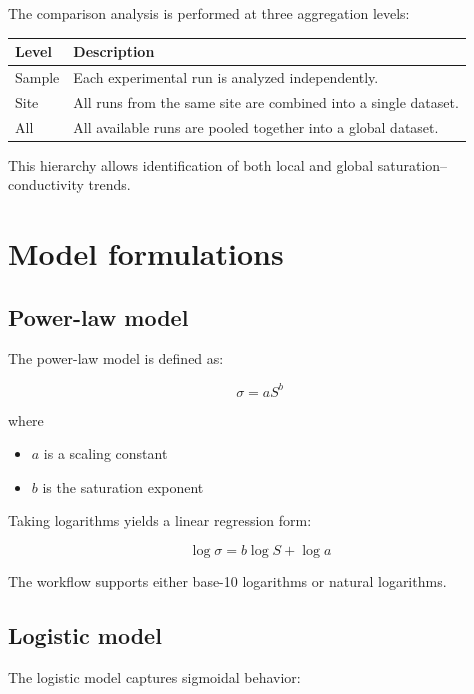\documentclass[11pt]{article}
\begin{document}
The comparison analysis is performed at three aggregation levels:

\begin{longtable}{p{} p{}}
\toprule
\textbf{Level} & \textbf{Description}\\
\midrule
\endhead

Sample & Each experimental run is analyzed independently.\\

Site & All runs from the same site are combined into a single dataset.\\

All & All available runs are pooled together into a global dataset.\\

\bottomrule
\end{longtable}

This hierarchy allows identification of both local and global saturation–conductivity trends.

\section{Model formulations}

\subsection{Power-law model}

The power-law model is defined as:

\[
\sigma = a S^{b}
\]

where

\begin{itemize}

\item $a$ is a scaling constant
\item $b$ is the saturation exponent

\end{itemize}

Taking logarithms yields a linear regression form:

\[
\log \sigma = b \log S + \log a
\]

The workflow supports either base-10 logarithms or natural logarithms.

\subsection{Logistic model}

The logistic model captures sigmoidal behavior:
\end{document}
